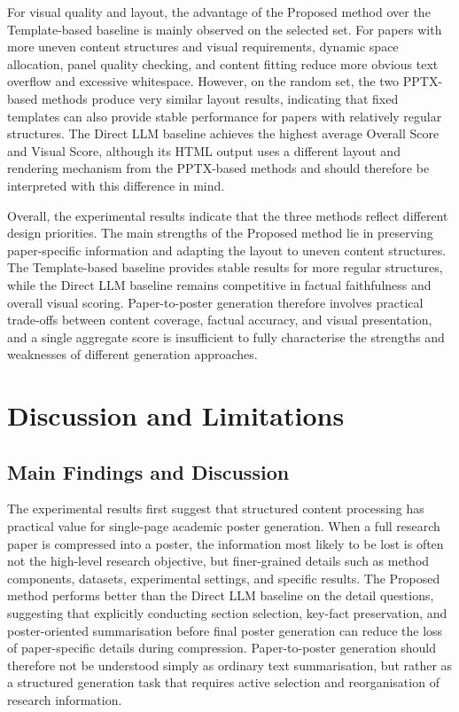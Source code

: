 \documentclass[12pt,oneside]{report}
\begin{document}
\vspace{1em}

For visual quality and layout, the advantage of the Proposed method over the Template-based baseline is mainly observed on the selected set. For papers with more uneven content structures and visual requirements, dynamic space allocation, panel quality checking, and content fitting reduce more obvious text overflow and excessive whitespace. However, on the random set, the two PPTX-based methods produce very similar layout results, indicating that fixed templates can also provide stable performance for papers with relatively regular structures. The Direct LLM baseline achieves the highest average Overall Score and Visual Score, although its HTML output uses a different layout and rendering mechanism from the PPTX-based methods and should therefore be interpreted with this difference in mind.

\vspace{1em}

Overall, the experimental results indicate that the three methods reflect different design priorities. The main strengths of the Proposed method lie in preserving paper-specific information and adapting the layout to uneven content structures. The Template-based baseline provides stable results for more regular structures, while the Direct LLM baseline remains competitive in factual faithfulness and overall visual scoring. Paper-to-poster generation therefore involves practical trade-offs between content coverage, factual accuracy, and visual presentation, and a single aggregate score is insufficient to fully characterise the strengths and weaknesses of different generation approaches.


\chapter{Discussion and Limitations}

\section{Main Findings and Discussion}

The experimental results first suggest that structured content processing has practical value for single-page academic poster generation. When a full research paper is compressed into a poster, the information most likely to be lost is often not the high-level research objective, but finer-grained details such as method components, datasets, experimental settings, and specific results. The Proposed method performs better than the Direct LLM baseline on the detail questions, suggesting that explicitly conducting section selection, key-fact preservation, and poster-oriented summarisation before final poster generation can reduce the loss of paper-specific details during compression. Paper-to-poster generation should therefore not be understood simply as ordinary text summarisation, but rather as a structured generation task that requires active selection and reorganisation of research information.
\end{document}
